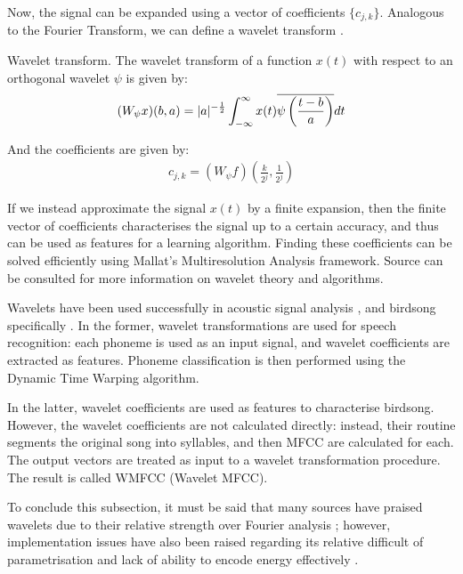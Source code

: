 \documentclass[../main.tex]{subfiles} \label{chapter_soa}
\begin{document}
\par Now, the signal can be expanded using a vector of coefficients $\{c_{j,k}\}$. Analogous to the Fourier Transform, we can define a wavelet transform \cite{Weisstein2015a}.
\begin{definition}{Wavelet transform.} \label{def_wtransform} The wavelet transform of a function $x(t)$ with respect to an orthogonal wavelet $\psi$ is given by:
\begin{align*}
(W_\psi x)(b, a) = \lvert a\rvert^{-\frac{1}{2}}\int_{-\infty}^\infty x(t)\overline{\psi\left(\frac{t-b}{a}\right)}dt
\end{align*}
\end{definition}
\par And the coefficients are given by:
\begin{align*}
c_{j,k} = (W_\psi f)(\frac{k}{2^j}, \frac{1}{2^j})
\end{align*}
\par If we instead approximate the signal $x(t)$ by a finite expansion, then the finite vector of coefficients characterises the signal up to a certain accuracy, and thus can be used as features for a learning algorithm. Finding these coefficients can be solved efficiently using Mallat's Multiresolution Analysis framework. Source \cite{Vidakovic1991} can be consulted for more information on wavelet theory and algorithms.
\par Wavelets have been used successfully in acoustic signal analysis \cite{Gamulkiewicz2003}, and birdsong specifically \cite{Chou2009}. In the former, wavelet transformations are used for speech recognition: each phoneme is used as an input signal, and wavelet coefficients are extracted as features. Phoneme classification is then performed using the Dynamic Time Warping algorithm. 
\par In the latter, wavelet coefficients are used as features to characterise birdsong. However, the wavelet coefficients are not calculated directly: instead, their routine segments the original song into syllables, and then MFCC are calculated for each. The output vectors are treated as input to a wavelet transformation procedure. The result is called WMFCC (Wavelet MFCC). 
\par To conclude this subsection, it must be said that many sources have praised wavelets due to their relative strength over Fourier analysis \cite{Gamulkiewicz2003,Weisstein2015a,Chui1992,Vidakovic1991}; however, implementation issues have also been raised regarding its relative difficult of parametrisation and lack of ability to encode energy effectively \cite{Garrett-Glaser2010}.
\end{document}

